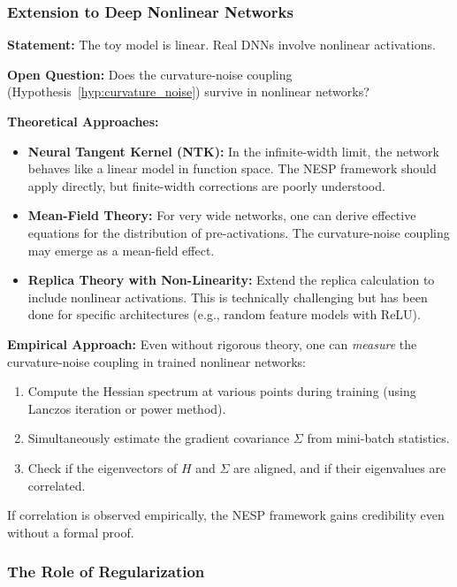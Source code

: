 \documentclass[
  journal=largetwo,
  simfonts=false,
  year=2025,
  volume=37,
]{cup-journal}
\begin{document}
\subsubsection{Extension to Deep Nonlinear Networks}

\textbf{Statement:} The toy model is linear. Real DNNs involve nonlinear activations.

\textbf{Open Question:} Does the curvature-noise coupling (Hypothesis~\ref{hyp:curvature_noise}) survive in nonlinear networks?

\textbf{Theoretical Approaches:}
\begin{itemize}
    \item \textbf{Neural Tangent Kernel (NTK):} In the infinite-width limit, the network behaves like a linear model in function space. The NESP framework should apply directly, but finite-width corrections are poorly understood.
    \item \textbf{Mean-Field Theory:} For very wide networks, one can derive effective equations for the distribution of pre-activations. The curvature-noise coupling may emerge as a mean-field effect.
    \item \textbf{Replica Theory with Non-Linearity:} Extend the replica calculation to include nonlinear activations. This is technically challenging but has been done for specific architectures (e.g., random feature models with ReLU).
\end{itemize}

\textbf{Empirical Approach:} Even without rigorous theory, one can \textit{measure} the curvature-noise coupling in trained nonlinear networks:
\begin{enumerate}
    \item Compute the Hessian spectrum at various points during training (using Lanczos iteration or power method).
    \item Simultaneously estimate the gradient covariance $\Sigma$ from mini-batch statistics.
    \item Check if the eigenvectors of $H$ and $\Sigma$ are aligned, and if their eigenvalues are correlated.
\end{enumerate}
If correlation is observed empirically, the NESP framework gains credibility even without a formal proof.

\subsubsection{The Role of Regularization}
\end{document}
